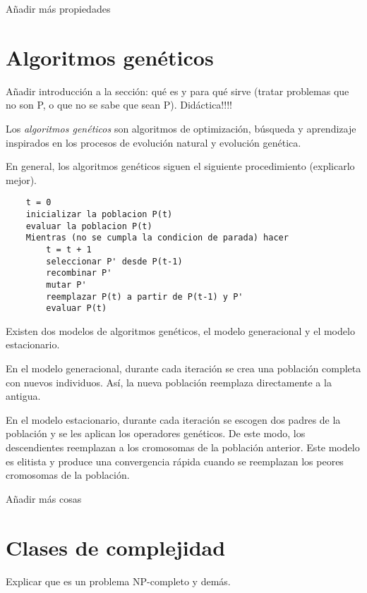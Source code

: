 Añadir más propiedades


\section{Algoritmos genéticos}

Añadir introducción a la sección: qué es y para qué sirve (tratar problemas que no son P, o que no se sabe que sean P). Didáctica!!!!

Los \emph{algoritmos genéticos} son algoritmos de optimización, búsqueda y aprendizaje inspirados en los procesos de evolución 
natural y evolución genética.

En general, los algoritmos genéticos siguen el siguiente procedimiento (explicarlo mejor).

\begin{lstlisting}
    t = 0
    inicializar la poblacion P(t)
    evaluar la poblacion P(t)
    Mientras (no se cumpla la condicion de parada) hacer 
        t = t + 1
        seleccionar P' desde P(t-1)
        recombinar P'
        mutar P'
        reemplazar P(t) a partir de P(t-1) y P'
        evaluar P(t)
\end{lstlisting}

Existen dos modelos de algoritmos genéticos, el modelo generacional y el modelo estacionario.

En el modelo generacional, durante cada iteración se crea una población completa con nuevos individuos.
Así, la nueva población reemplaza directamente a la antigua.

En el modelo estacionario, durante cada iteración se escogen dos padres de la población y se les aplican los operadores genéticos.
De este modo, los descendientes reemplazan a los cromosomas de la población anterior.
Este modelo es elitista y produce una convergencia rápida cuando se reemplazan los peores cromosomas de la población.

Añadir más cosas


\section{Clases de complejidad}

Explicar que es un problema NP-completo y demás.
